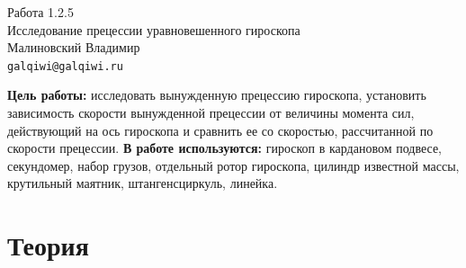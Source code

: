 \documentclass[a4paper,12pt]{article}
\begin{document}
\begin{center}
  \LARGE{Работа 1.2.5}\\[0.2cm]
  \LARGE{Исследование прецессии уравновешенного гироскопа}\\[0.2cm]
  \large{Малиновский Владимир}\\[0.2cm]
  \normalsize{\texttt{galqiwi@galqiwi.ru}}
\end{center}

\textbf{Цель работы:} исследовать вынужденную прецессию гироскопа, установить зависимость скорости вынужденной прецессии от величины момента сил, действующий на ось гироскопа и сравнить ее со скоростью, рассчитанной по скорости прецессии.
\textbf{В работе используются:} гироскоп в кардановом подвесе, секундомер, набор грузов, отдельный ротор гироскопа, цилиндр известной массы, крутильный маятник, штангенсциркуль, линейка.

\section*{Теория}
\end{document}
